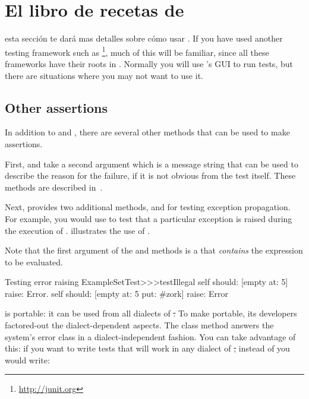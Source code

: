 \documentclass[a4paper,10pt,twoside]{book}
\begin{document}

\section{El libro de recetas de \SUnit }
esta sección te dará mas detalles sobre cómo usar \SUnit.  If you
have used another testing framework such as \JUnit\footnote{\url{http://junit.org}},
much of this will be familiar, since all these frameworks have their roots in \SUnit.
Normally you will use \SUnit's GUI to run tests, but there are
situations where you may not want to use it.
\subsection{Other assertions}
In addition to  and , there are several other methods that can be used to make assertions.

First,  and  take a second argument which is a message string that can be used to describe the reason for the failure, if it is not obvious from the test itself.   These methods are described in~.

Next, \sunit provides two additional methods,  and
 for testing exception propagation.
For example, you would use 
 to test that a particular exception is raised during the execution of .  
illustrates the use of \mbox{.}

Note that the first argument of the  and  methods is a  that \emph{contains} the expression to be evaluated.   

\begin{method}[ESTtestIllegal]{Testing error raising}
ExampleSetTest>>>testIllegal
	self should: [empty at: 5] raise: Error.
	self should: [empty at: 5 put: #zork] raise: Error
\end{method}

\sunit is portable: it can be used from all dialects of \st.  To make
\sunit portable, its developers factored-out the dialect-dependent aspects.  The class method  answers
the system's error class in a dialect-independent fashion. 
You can take advantage of this: if you want to write tests that will work in any dialect of \st, instead of 
 you would write:
\end{document}
